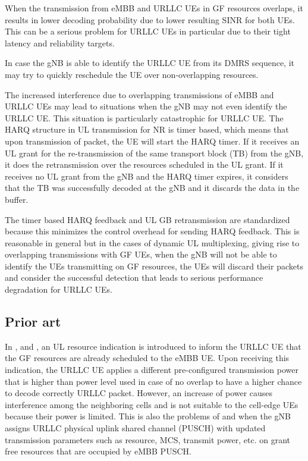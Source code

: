 \documentclass[conference]{IEEEtran}
\begin{document}
When the transmission from eMBB and URLLC UEs in GF resources overlaps, it results in lower decoding probability due to lower resulting SINR for both UEs. This can be a serious problem for URLLC UEs in particular due to their tight latency and reliability targets.

In case the gNB is able to identify the URLLC UE from its DMRS sequence, it may try to quickly reschedule the UE over non-overlapping resources. 

The increased interference due to overlapping transmissions of eMBB and URLLC UEs may lead to situations when the gNB may not even identify the URLLC UE. This situation is particularly catastrophic for URLLC UE. The HARQ structure in UL transmission for NR is timer based, which means that upon transmission of packet, the UE will start the HARQ timer. If it receives an UL grant for the re-transmission of the same transport block (TB) from the gNB, it does the retransmission over the resources scheduled in the UL grant. If it receives no UL grant from the gNB and the HARQ timer expires, it considers that the TB was successfully decoded at the gNB and it discards the data in the buffer. 

The timer based HARQ feedback and UL GB retransmission are standardized because this minimizes the control overhead for sending HARQ feedback. This is reasonable in general but in the cases of dynamic UL multiplexing, giving rise to overlapping transmissions with GF UEs, when the gNB will not be able to identify the UEs transmitting on GF resources, the UEs will discard their packets and consider the successful detection that leads to serious performance degradation for URLLC UEs.

\subsection{Prior art}\label{ICC}
In \cite{b1}, \cite{b2} and \cite{b3}, an UL resource indication is introduced to inform the URLLC UE that the GF resources are already scheduled to the eMBB UE. Upon receiving this indication, the URLLC UE applies a different pre-configured transmission power that is higher than power level used in case of no overlap to have a higher chance to decode correctly URLLC packet. However, an increase of power causes interference among the neighboring cells and is not suitable to the cell-edge UEs because their power is limited. This is also the problems of \cite{b4} and \cite{b5} when the gNB assigns URLLC physical uplink shared channel (PUSCH) with updated transmission parameters such as resource, MCS, transmit power, etc. on grant free resources that are occupied by eMBB PUSCH. 
\end{document}
